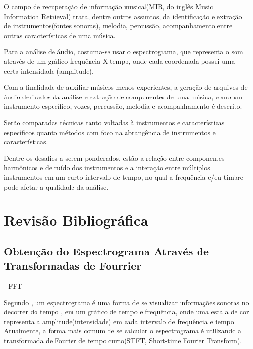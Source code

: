 \documentclass[
	12pt,				%
	openright,			%
	oneside,			%
	a4paper,			%
	english,			%
	brazil,				%
	]{abntex2}
\begin{document}
O campo de recuperação de informação musical(MIR, do inglês Music Information Retrieval) trata, dentre outros assuntos, da identificação e extração de instrumentos(fontes sonoras), melodia, percussão, acompanhamento entre outras características de uma música.

Para a análise de áudio, costuma-se usar o espectrograma, que representa o som através de um gráfico frequência X tempo, onde cada coordenada possui uma certa intensidade (amplitude).

Com a finalidade de auxiliar músicos menos experientes, a geração de arquivos de áudio derivados da análise e extração de componentes de uma música, como um instrumento específico, vozes, percussão, melodia e acompanhamento é descrito.

Serão comparadas técnicas tanto voltadas à instrumentos e características específicos quanto métodos com foco na abrangência de instrumentos e características.

Dentre os desafios a serem ponderados, estão a relação entre componentes harmônicos e de ruído dos instrumentos e a interação entre múltiplos instrumentos em um curto intervalo de tempo, no qual a frequência e/ou timbre pode afetar a qualidade da análise.

\chapter[Revisão Bibliográfica]{Revisão Bibliográfica}

\section{Obtenção do Espectrograma Através de Transformadas de Fourrier}

- FFT 

Segundo , um espectrograma é uma forma de se visualizar informações sonoras no decorrer do tempo , em um gráfico de tempo e frequência, onde uma escala de cor representa a amplitude(intensidade) em cada intervalo de frequência e tempo. Atualmente, a forma mais comum de se calcular o espectrograma é utilizando a transformada de Fourier de tempo curto(STFT, Short-time Fourier Transform).
\end{document}
